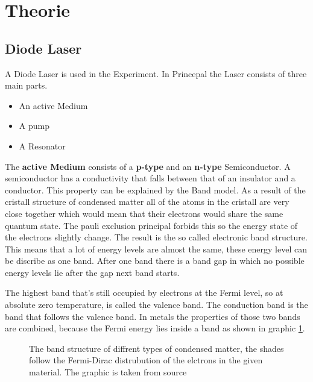 \section{Theorie}
\label{sec:Theorie}

\subsection{Diode Laser}

A Diode Laser is used in the Experiment.
In Princepal the Laser consists of three main parts.
\begin{itemize}
    \item An active Medium
    \item A pump
    \item A Resonator
\end{itemize}

The \textbf{active Medium} consists of a \textbf{p-type} and an \textbf{n-type} Semiconductor.
A semiconductor has a conductivity that falls between that of an insulator and a conductor.
This property can be explained by the Band model. 
As a result of the cristall structure of condensed matter all of the atoms in the cristall are very close together which would mean that their electrons would share the same quantum state.
The pauli exclusion principal forbids this so the energy state of the electrons slightly change.
The result is the so called electronic band structure.
This means that a lot of energy levels are almost the same, these energy level can be discribe as one band.
After one band there is a band gap in which no possible energy levels lie after the gap next band starts.

The highest band that's still occupied by electrons at the Fermi level, so at absolute zero temperature, is called the valence band.
The conduction band is the band that follows the valence band.
In metals the properties of those two bands are combined, because the Fermi energy lies inside a band as shown in graphic \ref{fig:band_structure}.

\begin{figure}
    \centering
    \caption{The band structure of diffrent types of condensed matter, the shades follow the Fermi-Dirac distrubution of the elctrons in the given material. The graphic is taken from source \cite{wikipedia_valence_conduction_band}}
    \label{fig:band_structure}
\end{figure}

